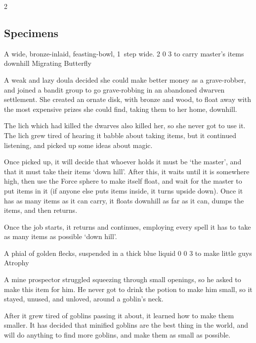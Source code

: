 \begin{multicols}{2}
\subsection{Specimens}

  {A wide, bronze-inlaid, feasting-bowl, 1~\gls{step} wide.}%
  {2}%
  {0}%
  {3}%
  {to carry master's items downhill}%
  {Migrating Butterfly}%
  {
    \setcounter{Fire}{2}
    \setcounter{Earth}{2}
    \setcounter{Water}{2}
    \setcounter{Vigilance}{2}
  }%

A weak and lazy \gls{doula} decided she could make better money as a grave-robber, and joined a bandit group to go grave-robbing in an abandoned dwarven settlement.
She created an ornate disk, with bronze and wood, to float away with the most expensive prizes she could find, taking them to her home, downhill.

The lich which had killed the dwarves also killed her, so she never got to use it.
The lich grew tired of hearing it babble about taking items, but it continued listening, and picked up some ideas about magic.

Once picked up, it will decide that whoever holds it must be `the master', and that it must take their items `down hill'.
After this, it waits until it is somewhere high, then use the Force \gls{sphere} to make itself float, and wait for the master to put items in it (if anyone else puts items inside, it turns upside down).
Once it has as many items as it can carry, it floats downhill as far as it can, dumps the items, and then returns.

Once the job starts, it returns and continues, employing every spell it has to take as many items as possible `down hill'.

\showStdSpells

  {A phial of golden flecks, suspended in a thick blue liquid}%
  {0}%
  {0}%
  {3}%
  {to make little guys}%
  {Atrophy}%
  {
    \setcounter{Earth}{2}
    \setcounter{Water}{2}
    \setcounter{Caving}{3}
  }%

A mine prospector struggled squeezing through small openings, so he asked  to make this item for him.
He never got to drink the potion to make him small, so it stayed, unused, and unloved, around a goblin's neck.

After it grew tired of goblins passing it about, it learned how to make them smaller.
It has decided that minified goblins are the best thing in the world, and will do anything to find more goblins, and make them as small as possible.


\end{multicols}

